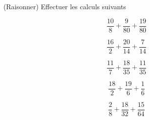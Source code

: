  (Raisonner) Effectuer les calculs suivants

\begin{multicols}{5}
$$\dfrac{10}{8}+\dfrac{9}{80}+\dfrac{19}{80}$$

$$\dfrac{16}{2}+\dfrac{20}{14}+\dfrac{7}{14}$$

$$\dfrac{11}{7}+\dfrac{18}{35}+\dfrac{11}{35}$$

$$\dfrac{18}{2}+\dfrac{19}{6}+\dfrac{1}{6}$$

$$\dfrac{2}{8}+\dfrac{18}{32}+\dfrac{15}{64}$$

\end{multicols}